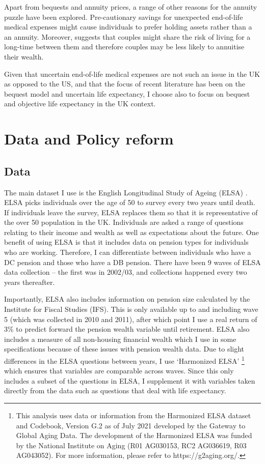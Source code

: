 \documentclass[12pt]{article}
\begin{document}
Apart from bequests and annuity prices, a range of other reasons for the annuity
puzzle have been explored. Pre-cautionary savings for unexpected end-of-life
medical expenses might cause individuals to prefer holding assets rather than a
an annuity. Moreover, \cite{vidalmelia_lejarragagarcia_munich_2004} suggests
that couples might share the risk of living for a long-time between them and
therefore couples may be less likely to annuitise their wealth.

Given that uncertain end-of-life medical expenses are not such an issue in the
UK as opposed to the US, and that the focus of recent literature has been on the
bequest model and uncertain life expectancy, I choose also to focus on bequest
and objective life expectancy in the UK context.

\section{Data and Policy reform}

\subsection{Data}

The main dataset I use is the English Longitudinal Study of Ageing (ELSA)
\citep{main_elsa_citation}. ELSA picks individuals over the age of 50 to survey
every two years until death. If individuals leave the survey, ELSA replaces them
so that it is representative of the over 50 population in the UK. Individuals
are asked a range of questions relating to their income and wealth as well as
expectations about the future. One benefit of using ELSA is that it includes
data on pension types for individuals who are working. Therefore, I can
differentiate between individuals who have a DC pension and those who have a DB
pension. There have been 9 waves of ELSA data collection -- the first was in
2002/03, and collections happened every two years thereafter.

Importantly, ELSA also includes information on pension size calculated by the
Institute for Fiscal Studies (IFS). This is only available up to and including
wave 5 (which was collected in 2010 and 2011), after which point I use a real return
of 3\% to predict forward the pension wealth variable until retirement. ELSA
also includes a measure of all non-housing financial wealth which I use in some
specifications because of these issues with pension wealth data. Due to slight
differences in the ELSA questions between years, I use `Harmonized ELSA'
\footnote{This analysis uses data or information from the Harmonized ELSA
    dataset and Codebook, Version G.2 as of July 2021 developed by the Gateway to
    Global Aging Data. The development of the Harmonized ELSA was funded by the
    National Institute on Aging (R01 AG030153, RC2 AG036619, R03 AG043052). For more
    information, please refer to https://g2aging.org/.} which ensures that variables
are comparable across waves. Since this only includes a subset of the questions
in ELSA, I supplement it with variables taken directly from the data such as
questions that deal with life expectancy.
\end{document}
